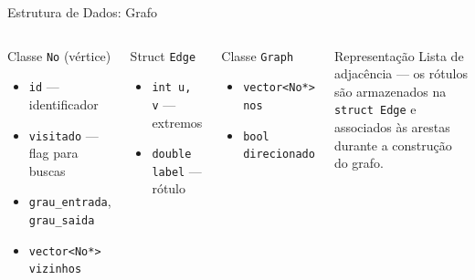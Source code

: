 \documentclass{beamer}
\begin{document}
\begin{frame}{Estrutura de Dados: Grafo}

\begin{columns}[T]

    \begin{block}{Classe \texttt{No} (vértice)}
        \begin{itemize}
            \item \texttt{id} — identificador
            \item \texttt{visitado} — flag para buscas
            \item \texttt{grau\_entrada}, \texttt{grau\_saida}
            \item \texttt{vector<No*> vizinhos}
        \end{itemize}
    \end{block}

    \vspace{0.3cm}

    \begin{block}{Struct \texttt{Edge}}
        \begin{itemize}
            \item \texttt{int u, v} — extremos
            \item \texttt{double label} — rótulo
        \end{itemize}
    \end{block}

    \begin{block}{Classe \texttt{Graph}}
        \begin{itemize}
            \item \texttt{vector<No*> nos}
            \item \texttt{bool direcionado}
        \end{itemize}
    \end{block}

    \vspace{0.3cm}

    \begin{exampleblock}{Representação}
        Lista de adjacência — os rótulos são armazenados na \texttt{struct Edge} e associados às arestas durante a construção do grafo.
    \end{exampleblock}

\end{columns}

\end{frame}
\end{document}
